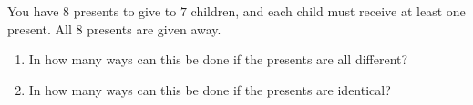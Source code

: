 You have $8$ presents to give to $7$ children, and each child must receive at least one present. All $8$ presents are given away.
\begin{enumerate}
\item[(a)] In how many ways can this be done if the presents are all different?
\item[(b)] In how many ways can this be done if the presents are identical?
\end{enumerate}

